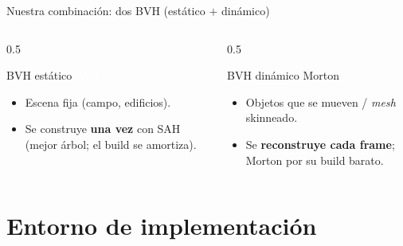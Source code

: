 \documentclass[aspectratio=169,11pt]{beamer}
\newcommand{\hl}[1]{{\color{primdk}\textbf{#1}}}
\begin{document}
\begin{frame}{Nuestra combinaci\'on: dos BVH (est\'atico $+$ din\'amico)}
\begin{columns}[T]
\begin{column}{0.5\textwidth}
\begin{block}{BVH est\'atico \textemdash{} \textcolor{white}{SAH}}
\begin{itemize}\itemsep1pt
  \item Escena fija (campo, edificios).
  \item Se construye \hl{una vez} con SAH (mejor \'arbol; el build se amortiza).
\end{itemize}
\end{block}
\end{column}
\begin{column}{0.5\textwidth}
\begin{exampleblock}{BVH din\'amico \textemdash{} Morton}
\begin{itemize}\itemsep1pt
  \item Objetos que se mueven / \emph{mesh} skinneado.
  \item Se \hl{reconstruye cada frame}; Morton por su build barato.
\end{itemize}
\end{exampleblock}
\end{column}
\end{columns}
\end{frame}

\section{Entorno de implementaci\'on}
\end{document}
